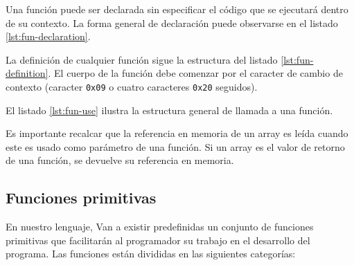 \documentclass[11pt, english]{article}
\begin{document}
Una función puede ser declarada sin especificar el código que se ejecutará dentro de su contexto. La forma general de declaración puede observarse en el listado \ref{lst:fun-declaration}.



La definición de cualquier función sigue la estructura del listado \ref{lst:fun-definition}. El cuerpo de la función debe comenzar por el caracter de cambio de contexto (caracter \texttt{0x09} o cuatro caracteres \texttt{0x20} seguidos).



El listado \ref{lst:fun-use} ilustra la estructura general de llamada a una función.



Es importante recalcar que la referencia en memoria de un array es leída cuando este es usado como parámetro de una función. Si un array es el valor de retorno de una función, se devuelve su referencia en memoria.


\subsection{Funciones primitivas}
En nuestro lenguaje, Van a existir predefinidas un conjunto de funciones primitivas que facilitarán al programador su trabajo en el desarrollo del programa. Las funciones están divididas en las siguientes categorías:
\end{document}
